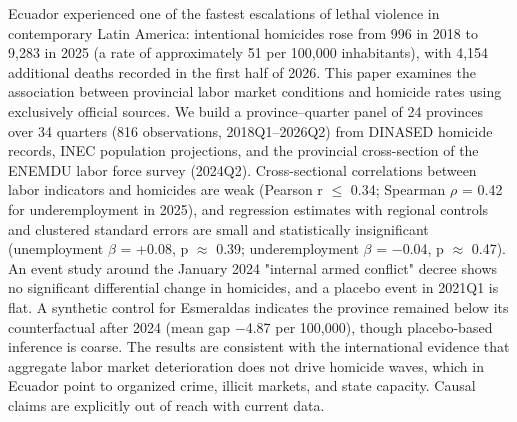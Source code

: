 Ecuador experienced one of the fastest escalations of lethal violence in contemporary Latin America: intentional homicides rose from 996 in 2018 to 9,283 in 2025 (a rate of approximately 51 per 100,000 inhabitants), with 4,154 additional deaths recorded in the first half of 2026. This paper examines the association between provincial labor market conditions and homicide rates using exclusively official sources. We build a province--quarter panel of 24 provinces over 34 quarters (816 observations, 2018Q1--2026Q2) from DINASED homicide records, INEC population projections, and the provincial cross-section of the ENEMDU labor force survey (2024Q2). Cross-sectional correlations between labor indicators and homicides are weak (Pearson r $\leq$ 0.34; Spearman $\rho$ = 0.42 for underemployment in 2025), and regression estimates with regional controls and clustered standard errors are small and statistically insignificant (unemployment $\beta$ = +0.08, p $\approx$ 0.39; underemployment $\beta$ = $-$0.04, p $\approx$ 0.47). An event study around the January 2024 "internal armed conflict" decree shows no significant differential change in homicides, and a placebo event in 2021Q1 is flat. A synthetic control for Esmeraldas indicates the province remained below its counterfactual after 2024 (mean gap $-$4.87 per 100,000), though placebo-based inference is coarse. The results are consistent with the international evidence that aggregate labor market deterioration does not drive homicide waves, which in Ecuador point to organized crime, illicit markets, and state capacity. Causal claims are explicitly out of reach with current data.